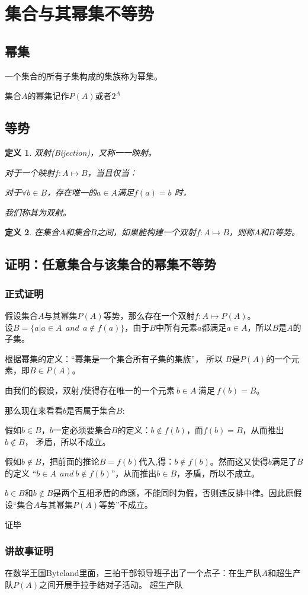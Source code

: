 \documentclass[UTF8,10pt,a4paper]{ctexart}
\newtheorem{deff}{定义}
\begin{document}
\section{集合与其幂集不等势}
	\subsection{幂集}
		一个集合的所有子集构成的集族称为幂集。
		 		 
		集合$A$的幂集记作$P(A)$或者$2^A$
	\subsection{等势}
		\begin{deff}
			双射(Bijection)，又称一一映射。
              			
			对于一个映射$f:A \mapsto B$，当且仅当：
			 
			对于$\forall b\in B$，存在唯一的$a\in A$满足$f(a)=b$ 时，
			
			我们称其为双射。
		\end{deff}
	
		\begin{deff}
			在集合$A$和集合$B$之间，如果能构建一个双射$f:A \mapsto B$，则称$A$和$B$等势。
		\end{deff}

	\subsection{证明：任意集合与该集合的幂集不等势}
		\subsubsection{正式证明}
			假设集合$A$与其幂集$P(A)$等势，那么存在一个双射$f:A \mapsto P(A)$。\\
			设$B=\{a| a\in A\ \ and\ \ a\notin f(a) \}$，由于$B$中所有元素$a$都满足$a\in A$，所以$B$是$A$的子集。
			 
			根据幂集的定义：“幂集是一个集合所有子集的集族”， 所以 $B$是$P(A)$的一个元素，即$B \in P(A)$。
			
			由我们的假设，双射$f$使得存在唯一的一个元素$\ b\in A\ $满足$\ f(b)=B$。
			
			那么现在来看看$b$是否属于集合$B$:
			
			假如$b\in B$，$b$一定必须要集合$B$的定义：$b \notin f(b)$，而$f(b)=B$，从而推出$b \notin B$， 矛盾，所以不成立。
			
			假如$b\notin B$，把前面的推论$B=f(b)$代入,得：$b \notin f(b)$。然而这又使得$b$满足了$B$的定义
			“$b\in A\ \ and\ b \notin f(b)$”，从而推出$b \in B$，矛盾，所以不成立。
			
			$b\in B$和$b\notin B$是两个互相矛盾的命题，不能同时为假，否则违反排中律。因此原假设“集合$A$与其幂集$P(A)$等势”不成立。
			
			证毕
		\subsubsection{讲故事证明}
			在数学王国Byteland里面，三拍干部领导班子出了一个点子：在生产队$A$和超生产队$P(A)$之间开展手拉手结对子活动。
			超生产队
\end{document}
